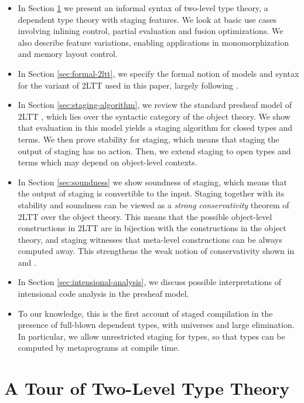 \documentclass[acmsmall]{acmart}
\theoremstyle{remark}
\begin{document}
\begin{itemize}
  \item In Section \ref{sec:tour-of-2ltt} we present an informal syntax of two-level
    type theory, a dependent type theory with staging features. We look at basic
    use cases involving inlining control, partial evaluation and fusion
    optimizations. We also describe feature variations, enabling applications in
    monomorphization and memory layout control.
  \item In Section \ref{sec:formal-2ltt}, we specify the formal notion of models and
    syntax for the variant of 2LTT used in this paper, largely following \cite{twolevel}.
  \item In Section \ref{sec:staging-algorithm}, we review the standard presheaf
    model of 2LTT \cite[Section~2.5.3]{twolevel}, which lies over the syntactic
    category of the object theory.  We show that evaluation in this model yields
    a staging algorithm for closed types and terms. We then prove stability for
    staging, which means that staging the output of staging has no action. Then,
    we extend staging to open types and terms which may depend on object-level
    contexts.
  \item
    In Section \ref{sec:soundness} we show soundness of staging, which means that
    the output of staging is convertible to the input.  Staging together with
    its stability and soundness can be viewed as a \emph{strong conservativity}
    theorem of 2LTT over the object theory. This means that the possible
    object-level constructions in 2LTT are in bijection with the constructions
    in the object theory, and staging witnesses that meta-level constructions
    can be always computed away. This strengthens the weak notion of
    conservativity shown in \cite{capriotti2017models} and \cite{twolevel}.
  \item
    In Section \ref{sec:intensional-analysis}, we discuss possible interpretations
    of intensional code analysis in the presheaf model.
  \item To our knowledge, this is the first account of staged compilation in the
    presence of full-blown dependent types, with universes and large
    elimination. In particular, we allow unrestricted staging for types, so that
    types can be computed by metaprograms at compile time.
\end{itemize}

\section{A Tour of Two-Level Type Theory}\label{sec:tour-of-2ltt}
\end{document}
